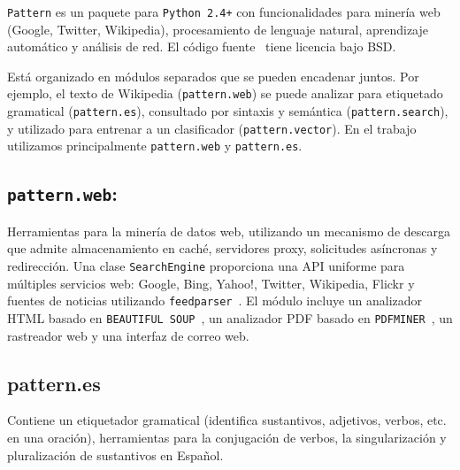 \texttt{Pattern} es un paquete para \texttt{Python 2.4+} con funcionalidades para minería web (Google, Twitter, Wikipedia), procesamiento de lenguaje natural, aprendizaje automático y análisis de red. El código fuente~\autocite{clips} tiene licencia bajo BSD.

Está organizado en módulos separados que se pueden encadenar juntos. Por ejemplo, el texto de Wikipedia (\texttt{pattern.web}) se puede analizar para etiquetado gramatical (\texttt{pattern.es}), consultado por sintaxis y semántica (\texttt{pattern.search}), y utilizado para entrenar a un clasificador (\texttt{pattern.vector}). En el trabajo utilizamos principalmente \texttt{pattern.web} y \texttt{pattern.es}.

\subsection{\texttt{pattern.web}:}\label{pattern.web} Herramientas para la minería de datos web, utilizando un mecanismo de descarga que admite almacenamiento en caché, servidores proxy, solicitudes asíncronas y redirección. Una clase \texttt{SearchEngine} proporciona una API uniforme para múltiples servicios web: Google, Bing, Yahoo!, Twitter, Wikipedia, Flickr y fuentes de noticias utilizando \texttt{feedparser}~\autocite{feedparser}. El módulo incluye un analizador HTML basado en \texttt{BEAUTIFUL SOUP}~\autocite{bsoup}, un analizador PDF basado en \texttt{PDFMINER}~\autocite{pdfminer}, un rastreador web y una interfaz de correo web.

\subsection{pattern.es}\label{pattern.es} Contiene un etiquetador gramatical (identifica sustantivos, adjetivos, verbos, etc. en una oración), herramientas para la conjugación de verbos, la singularización y pluralización de sustantivos en Español.
